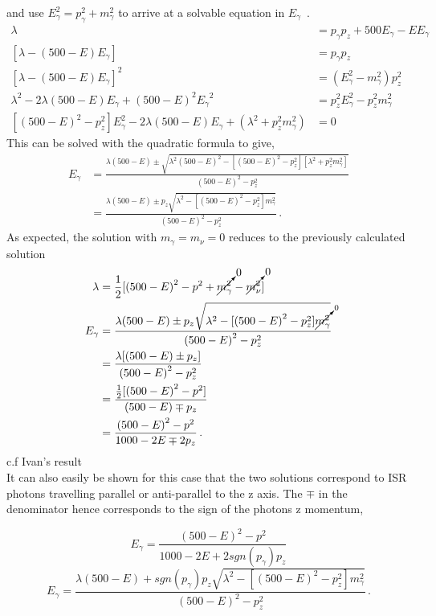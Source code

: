  and use  ${E}_{\gamma}^{2} = {p}_{\gamma}^{2} +{m}_{\gamma}^{2} $ to arrive at a solvable equation in ${E}_{\gamma} $\, .
  \begin{align}
 {\lambda} &=   {p}_{\gamma}{p}_{z} + 500{E}_{\gamma} - E{E}_{\gamma} \\
  [{\lambda} - (500 - E){E}_{\gamma} ] &=   {p}_{\gamma}{p}_{z} \\
    {[{\lambda} - (500 - E){E}_{\gamma} ]}^{2} &= ({E}_{\gamma}^{2} - {m}_{\gamma}^{2}){p}_{z}^{2} \\
    {\lambda}^{2} - 2{\lambda}(500 - E){E}_{\gamma}  + {(500 - E)}^{2}{{E}_{\gamma}}^{2} &=   {p}_{z}^{2}{E}_{\gamma}^{2} - {p}_{z}^{2}{m}_{\gamma}^{2} \\
        [{(500 - E)}^{2} -   {p}_{z}^{2}]{E}_{\gamma}^{2}  - 2{\lambda}(500 - E){E}_{\gamma} +  ({\lambda}^{2} + {p}_{z}^{2}{m}_{\gamma}^{2})  &= 0
     \end{align}
This can be solved with the quadratic formula to give,
  \begin{align}
 {E}_{\gamma} &= \frac{{\lambda}(500 - E)  \pm \sqrt{ {\lambda}^{2}{(500 - E)}^{2} - [{(500 - E)}^{2} -   {p}_{z}^{2}][{\lambda}^{2} + {p}_{z}^{2}{m}_{\gamma}^{2}] }}{{(500 - E)}^{2} -   {p}_{z}^{2}}\\
 					&= \frac{{\lambda}(500 - E)  \pm {p}_{z}\sqrt{ {\lambda}^{2} - [{(500 - E)}^{2} -   {p}_{z}^{2}]{m}_{\gamma}^{2}}}{{(500 - E)}^{2} -   {p}_{z}^{2}}\, .
     \end{align}
As expected, the solution with ${m}_{\gamma} = {m}_{\nu} =0$  reduces to the previously calculated solution
\begin{align}
 {\lambda} &= \frac{1}{2}[{(500 - E)}^2 - {p}^{2} + \cancelto{0}{{m}_{\gamma}^{2} }- \cancelto{0}{{m}_{\nu}^{2}}]\\
  {E}_{\gamma} &= \frac{{\lambda}(500 - E)  \pm {p}_{z}\sqrt{ {\lambda}^{2} - [{(500 - E)}^{2} -   {p}_{z}^{2}] \cancelto{0}{{m}_{\gamma}^{2}}}}{{(500 - E)}^{2} -   {p}_{z}^{2}}\\
  &= \frac{{\lambda}[(500 - E)  \pm {p}_{z}]}{{(500 - E)}^{2} -   {p}_{z}^{2}} \\
  &= \frac{ \frac{1}{2}[{(500 - E)}^2 - {p}^{2}]}{(500 - E)  \mp {p}_{z}} \\
   &= \frac{ {(500 - E)}^2 - {p}^{2}}{1000 -2 E  \mp 2{p}_{z}}\, .
     \end{align}
  c.f Ivan's result \cite{IvanMarchesini}
  \\
It can also easily be shown for this case that the two solutions correspond to ISR photons travelling parallel or anti-parallel to the z axis. The $\mp$ in the denominator hence corresponds to the sign of the photons z momentum,

\begin{equation}
  {E}_{\gamma} = \frac{ {(500 - E)}^2 - {p}^{2}}{1000 -2 E + 2sgn({p}_{\gamma}) {p}_{z}}
     \end{equation}
\begin{equation}
 {E}_{\gamma} = \frac{{\lambda}(500 - E) + sgn({p}_{\gamma}) {p}_{z}\sqrt{ {\lambda}^{2} - [{(500 - E)}^{2} -   {p}_{z}^{2}]{m}_{\gamma}^{2}}}{{(500 - E)}^{2} -   {p}_{z}^{2}}\, .
     \end{equation}
